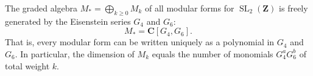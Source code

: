 The graded algebra $M_* = \bigoplus_{k \geq 0} M_k$ of all modular forms for $\operatorname{SL}_2(\mathbf{Z})$ is freely generated by the Eisenstein series $G_4$ and $G_6$:
$$
M_* = \mathbf{C}[G_4, G_6].
$$
That is, every modular form can be written uniquely as a polynomial in $G_4$ and $G_6$. In particular, the dimension of $M_k$ equals the number of monomials $G_4^a G_6^b$ of total weight $k$.
